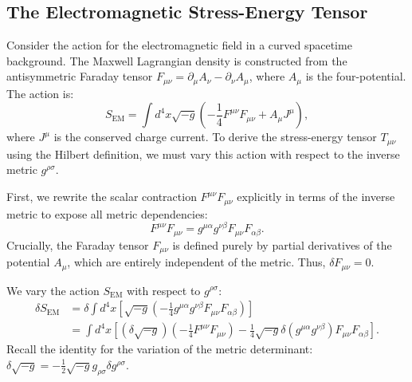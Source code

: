 \documentclass[11pt, a4paper]{report}
\begin{document}
\subsection{The Electromagnetic Stress-Energy Tensor}

Consider the action for the electromagnetic field in a curved spacetime background. The Maxwell Lagrangian density is constructed from the antisymmetric Faraday tensor $F_{\mu\nu} = \partial_{\mu}A_{\nu} - \partial_{\nu}A_{\mu}$, where $A_{\mu}$ is the four-potential. The action is:
\begin{equation}
\label{eq:em_action}
S_{\text{EM}} = \int d^{4}x \sqrt{-g} \left( -\frac{1}{4} F^{\mu\nu}F_{\mu\nu} + A_{\mu}J^{\mu} \right),
\end{equation}
where $J^{\mu}$ is the conserved charge current. To derive the stress-energy tensor $T_{\mu\nu}$ using the Hilbert definition, we must vary this action with respect to the inverse metric $g^{\rho\sigma}$. 

First, we rewrite the scalar contraction $F^{\mu\nu}F_{\mu\nu}$ explicitly in terms of the inverse metric to expose all metric dependencies:
\begin{equation}
F^{\mu\nu}F_{\mu\nu} = g^{\mu\alpha}g^{\nu\beta}F_{\mu\nu}F_{\alpha\beta}.
\end{equation}
Crucially, the Faraday tensor $F_{\mu\nu}$ is defined purely by partial derivatives of the potential $A_{\mu}$, which are entirely independent of the metric. Thus, $\delta F_{\mu\nu} = 0$.

We vary the action $S_{\text{EM}}$ with respect to $g^{\rho\sigma}$:
\begin{align}
\delta S_{\text{EM}} &= \delta \int d^{4}x \left[ \sqrt{-g} \left( -\frac{1}{4} g^{\mu\alpha}g^{\nu\beta}F_{\mu\nu}F_{\alpha\beta} \right) \right] \nonumber \\
&= \int d^{4}x \left[ (\delta\sqrt{-g})\left(-\frac{1}{4} F^{\mu\nu}F_{\mu\nu}\right) - \frac{1}{4}\sqrt{-g} \delta(g^{\mu\alpha}g^{\nu\beta}) F_{\mu\nu}F_{\alpha\beta} \right].
\end{align}
Recall the identity for the variation of the metric determinant: $\delta\sqrt{-g} = -\frac{1}{2}\sqrt{-g}g_{\rho\sigma}\delta g^{\rho\sigma}$. 
\end{document}
